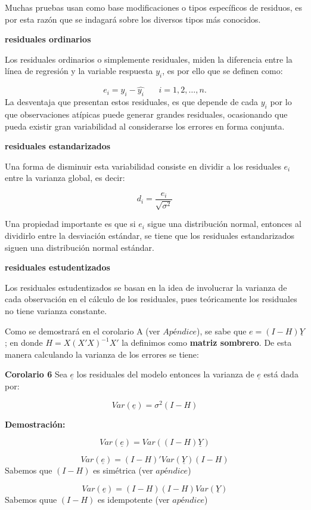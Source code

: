\documentclass[
  a4paper,
  oneside,
  openany]{book}
\begin{document}
Muchas pruebas usan como base modificaciones o tipos específicos de residuos, es por esta razón que se indagará sobre los diversos tipos más conocidos.

\textbf{residuales ordinarios}

Los residuales ordinarios o simplemente residuales, miden la diferencia entre la línea de regresión y la variable respuesta \(y_{i}\), es por ello que se definen como:

\[e_{i}=y_{i}-\hat{y_{i}}  \ \ \ \ \ \ \ \ i=1,2,\ldots ,n.\]
La desventaja que presentan estos residuales, es que depende de cada \(y_{i}\) por lo que observaciones atípicas puede generar grandes residuales, ocasionando que pueda existir gran variabilidad al considerarse los errores en forma conjunta.

\textbf{residuales estandarizados}

Una forma de disminuir esta variabilidad consiste en dividir a los residuales \(e_{i}\) entre la varianza global, es decir:

\[d_{i}=\frac{e_{i}}{\sqrt{\sigma^2}}\]

Una propiedad importante es que si \(e_{i}\) sigue una distribución normal, entonces al dividirlo entre la desviación estándar, se tiene que los residuales estandarizados siguen una distribución normal estándar.

\textbf{residuales estudentizados}

Los residuales estudentizados se basan en la idea de involucrar la varianza de cada observación en el cálculo de los residuales, pues teóricamente los residuales no tiene varianza constante.

Como se demostrará en el corolario A (ver \(Apéndice\)), se sabe que \(e=(I-H)\underline{Y}\); en donde \(H=X(X'X)^{-1}X'\) la definimos como \textbf{matriz sombrero}.
De esta manera calculando la varianza de los errores se tiene:

\textbf{Corolario 6} Sea \(\underline{e}\) los residuales del modelo entonces la varianza de \(\underline{e}\) está dada por:

\[Var(\underline{e})=\sigma^2(I-H)\]

\textbf{Demostración:}

\[Var(\underline{e})=Var((I-H)\underline{Y})\]

\[Var(\underline{e})=(I-H)'Var(\underline{Y})(I-H)\]
Sabemos que \((I-H)\) es simétrica (ver \(apéndice\))

\[Var(\underline{e})=(I-H)(I-H)Var(\underline{Y})\]
Sabemos quue \((I-H)\) es idempotente (ver \(apéndice\))
\end{document}

